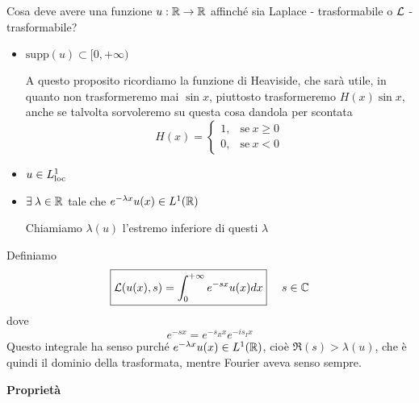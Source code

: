 Cosa deve avere una funzione $u: \mathbb{R}\rightarrow \mathbb{R}$ affinché sia Laplace - trasformabile o $\mathcal{L}$ - trasformabile?
\begin{itemize}
\item $\mathrm{supp}(u) \subset [0, + \infty)$

A questo proposito ricordiamo la funzione di Heaviside, che sarà utile, in quanto non trasformeremo mai $\sin x$, piuttosto trasformeremo $H(x)\sin x$, anche se talvolta sorvoleremo su questa cosa dandola per scontata
\begin{equation*}
H(x) =
\begin{cases}
1, & \text{se} \ x\geq 0\\
0, & \text{se} \ x < 0
\end{cases}
\end{equation*}
\item $u\in L^{1}_{\operatorname{loc}}$
\item $\exists \lambda \in \RR$ tale che $e^{- \lambda x} u(x) \in L^{1}(\mathbb{R})$

Chiamiamo $\lambda (u)$ l'estremo inferiore di questi $\lambda $
\end{itemize}
\begin{defn}
Definiamo
\begin{equation*}
\boxed{\mathcal{L}(u(x), s) = \int^{+ \infty}_{0} e^{- sx} u(x) dx} \ \ \ \ s\in \mathbb{C}
\end{equation*}
dove
\begin{equation*}
e^{- sx} = e^{- s_{R} x} e^{- is_{I} x}
\end{equation*}
Questo integrale ha senso purché $e^{- \lambda x} u(x) \in L^{1}(\mathbb{R})$, cioè $\Re (s) > \lambda (u)$, che è quindi il dominio della trasformata, mentre Fourier aveva senso sempre.
\end{defn}
\textbf{Proprietà}
